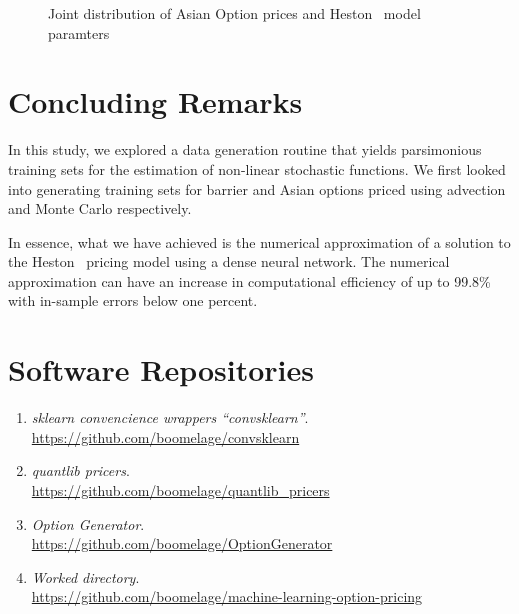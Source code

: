 \documentclass[11pt]{article}
\begin{document}
\begin{figure}[htbp]
\begin{minipage}{0.48\textwidth}
				\caption{Joint distribution of Asian Option prices and Heston~\cite{heston_1993_a} model paramters}
				\label{fig:Shapely Asians}
			\end{minipage}
		\end{figure}%

\section{Concluding Remarks}
	In this study, we explored a data generation routine that yields parsimonious training sets for the estimation of non-linear stochastic functions. We first looked into generating training sets for barrier and Asian options priced using advection and Monte Carlo respectively.
	\par
	In essence, what we have achieved is the numerical approximation of a solution to the Heston~\cite{heston_1993_a} pricing model using a dense neural network. The numerical approximation can have an increase in computational efficiency of up to 99.8\% with in-sample errors below one percent.
	
\vfill
\section{Software Repositories}
	\begin{enumerate}
		\item \emph{sklearn convencience wrappers ``convsklearn''}. \\ \url{https://github.com/boomelage/convsklearn}
	
		\item \emph{quantlib pricers}. \\
		\url{https://github.com/boomelage/quantlib_pricers}
	
		\item \emph{Option Generator}. \\
		\url{https://github.com/boomelage/OptionGenerator}
	
		\item \emph{Worked directory}. \\
		\url{https://github.com/boomelage/machine-learning-option-pricing}
	\end{enumerate}
\vfill

\newpage
{}
\printbibliography
\newpage

\end{document}
